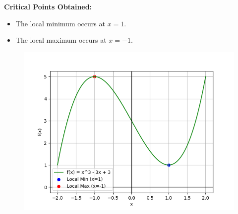 \documentclass[journal]{IEEEtran}
\begin{document}
\textbf{Critical Points Obtained:}
\begin{itemize}
    \item The local minimum occurs at \( x = 1 \).
    \item The local maximum occurs at \( x = -1 \).
\end{itemize}

\begin{figure}[ht]
	\centering
	\includegraphics[width=1\textwidth]{figs/fig.png}
	\label{fig:Plot1}
\end{figure}
\end{document}
